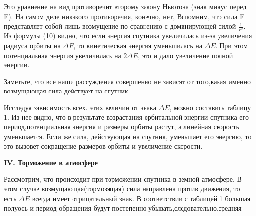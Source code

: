 \leftskip=0.3cm \rightskip=1cm
\fontsize{14}{10}\selectfont
\begin{minipage}{8cm}
	\hspace{10mm}Это уравнение на вид противоречит второму закону Ньютона (знак минус перед F). На самом деле никакого противоречия, конечно, нет, Вспомним, что сила F представляет собой лишь возмущение по сравнению с доминирующей силой $\frac{1}{r^2}$. Из формулы (10) видно, что если энергия спутника увеличилась из-за увеличения радиуса орбиты на $\Delta E$, то кинетическая энергия уменьшилась на $\Delta E$.
При этом потенциальная энергия увеличилась на $2\Delta E$, это и дало увеличение полной энергии.
	
	\hspace{10mm}Заметьте, что все наши рассуждения совершенно не зависят от того,какая именно возмущающая сила действует на спутник.
	
	\hspace{10mm}Исследуя зависимость всех. этих величин от знака $\Delta E$, можно составить таблицу 1. Из нее видно, что в результате возрастания орбитальной энергии спутника его период,потенциальная энергия и размеры орбиты растут, а линейная скорость уменьшается. Если же сила, действующая на спутник, уменьшает его	энергию, то это вызовет сокращение размеров орбиты и увеличение скорости.
	\begin{center}
		\textbf{IV. Торможение в атмосфере}
	\end{center}
	
	\hspace{10mm}Рассмотрим, что происходит при	торможении спутника в земной атмосфере. В этом случае возмущающая(тормозящая) сила направлена против движения, то есть $\Delta E$ всегда имеет отрицательный знак. В соответствии с таблицей 1 большая полуось и период обращения будут постепенно убывать,следовательно,средняя
	 
\end{minipage}




